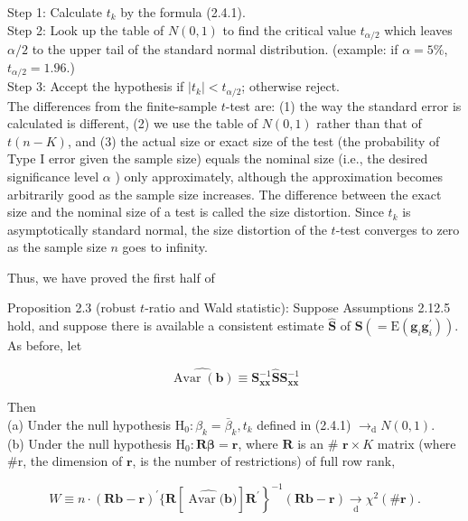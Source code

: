 \documentclass[10pt]{article}
\begin{document}
Step 1: Calculate $t_{k}$ by the formula (2.4.1).\\
Step 2: Look up the table of $N(0,1)$ to find the critical value $t_{\alpha / 2}$ which leaves $\alpha / 2$ to the upper tail of the standard normal distribution. (example: if $\alpha=5 \%$, $t_{\alpha / 2}=1.96$.)\\
Step 3: Accept the hypothesis if $\left|t_{k}\right|<t_{\alpha / 2}$; otherwise reject.\\
The differences from the finite-sample $t$-test are: (1) the way the standard error is calculated is different, (2) we use the table of $N(0,1)$ rather than that of $t(n-K)$, and (3) the actual size or exact size of the test (the probability of Type I error given the sample size) equals the nominal size (i.e., the desired significance level $\alpha$ ) only approximately, although the approximation becomes arbitrarily good as the sample size increases. The difference between the exact size and the nominal size of a test is called the size distortion. Since $t_{k}$ is asymptotically standard normal, the size distortion of the $t$-test converges to zero as the sample size $n$ goes to infinity.

Thus, we have proved the first half of

Proposition 2.3 (robust $t$-ratio and Wald statistic): Suppose Assumptions 2.12.5 hold, and suppose there is available a consistent estimate $\widehat{\mathbf{S}}$ of $\mathbf{S}\left(=\mathrm{E}\left(\mathbf{g}_{i} \mathbf{g}_{i}^{\prime}\right)\right)$. As before, let

$$
\widehat{\operatorname{Avar}(\mathbf{b})} \equiv \mathbf{S}_{\mathbf{x x}}^{-1} \widehat{\mathbf{S}} \mathbf{S}_{\mathbf{x x}}^{-1}
$$

Then\\
(a) Under the null hypothesis $\mathrm{H}_{0}: \beta_{k}=\bar{\beta}_{k}, t_{k}$ defined in (2.4.1) $\rightarrow_{\mathrm{d}} N(0,1)$.\\
(b) Under the null hypothesis $\mathrm{H}_{0}: \mathbf{R} \boldsymbol{\beta}=\mathbf{r}$, where $\mathbf{R}$ is an \# $\mathbf{r} \times K$ matrix (where \#r, the dimension of $\mathbf{r}$, is the number of restrictions) of full row rank,


\begin{equation*}
\left.W \equiv n \cdot(\mathbf{R} \mathbf{b}-\mathbf{r})^{\prime}\{\mathbf{R}[\widehat{\operatorname{Avar}(\mathbf{b}})] \mathbf{R}^{\prime}\right\}^{-1}(\mathbf{R} \mathbf{b}-\mathbf{r}) \underset{\mathrm{d}}{\rightarrow} \chi^{2}(\# \mathbf{r}) . \tag{2.4.2}
\end{equation*}
\end{document}
